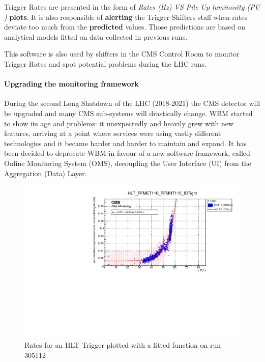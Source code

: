 \documentclass[a4, oneside, 11pt, nobib]{memoir}
\begin{document}
		Trigger Rates are presented in the form of \textit{Rates (Hz) VS Pile Up luminosity (PU \cite{Herr:941318})} \textbf{plots}.  It is also responsible of \textbf{alerting} the Trigger Shifters staff when rates deviate too much from the \textbf{predicted} values. Those predictions are based on analytical models fitted on data collected in previous runs.

		This software is also used by shifters in the CMS Control Room to monitor Trigger Rates and spot potential problems during the LHC runs.


		\paragraph{Upgrading the monitoring framework} 

		During the second Long Shutdown of the LHC (2018-2021) the CMS detector will be upgraded and many CMS sub-systems will drastically change. WBM started to show its age and problems: it unexpectedly and heavily grew with new features, arriving at a point where services were using vastly different technologies and it became harder and harder to maintain and expand. It has been decided to deprecate WBM in favour of a new software framework, called Online Monitoring System (OMS), decoupling the User Interface (UI) from the Aggregation (Data) Layer.

\begin{figure}[H]
    \centerline{
        \includegraphics[width=0.6\paperwidth]{figures/RMT_305112_HLT_PFMET110_PFMHT110_IDTight.pdf}}
    \caption{Rates for an HLT Trigger plotted with a fitted function on run 305112}
    \label{fig:ratemon_hlt}
\end{figure}
\end{document}
